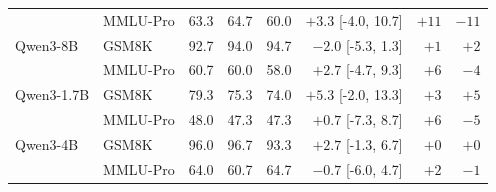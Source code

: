 \begin{tabular}{llcccrrr}
 & MMLU-Pro & 63.3 & 64.7 & 60.0 & $+3.3$ [-4.0, 10.7] & $+11$ & $-11$ \\
Qwen3-8B & GSM8K & 92.7 & 94.0 & 94.7 & $-2.0$ [-5.3, 1.3] & $+1$ & $+2$ \\
 & MMLU-Pro & 60.7 & 60.0 & 58.0 & $+2.7$ [-4.7, 9.3] & $+6$ & $-4$ \\
Qwen3-1.7B & GSM8K & 79.3 & 75.3 & 74.0 & $+5.3$ [-2.0, 13.3] & $+3$ & $+5$ \\
 & MMLU-Pro & 48.0 & 47.3 & 47.3 & $+0.7$ [-7.3, 8.7] & $+6$ & $-5$ \\
Qwen3-4B & GSM8K & 96.0 & 96.7 & 93.3 & $+2.7$ [-1.3, 6.7] & $+0$ & $+0$ \\
 & MMLU-Pro & 64.0 & 60.7 & 64.7 & $-0.7$ [-6.0, 4.7] & $+2$ & $-1$ \\
\bottomrule
\end{tabular}
